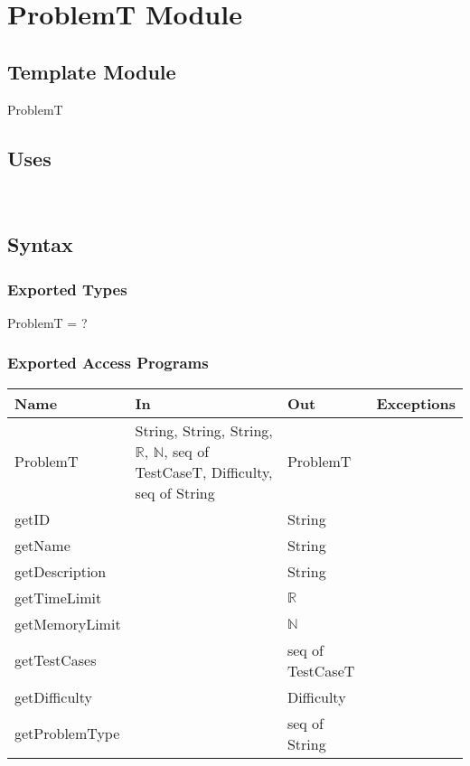 \documentclass[12pt, titlepage]{article}
\begin{document}
\newpage

\section{ProblemT Module} \label{ProblemT} 

\subsection{Template Module}

ProblemT

\subsection{Uses}
\\

\subsection{Syntax}


\subsubsection{Exported Types}

ProblemT = ?

\subsubsection{Exported Access Programs}

\begin{center}
\begin{tabular}{ |  p{4cm} | p{3cm} |  p{3cm} | p{5cm} | }
\hline
\textbf{Name} & \textbf{In} & \textbf{Out} & \textbf{Exceptions} \\
\hline
ProblemT & String, String, String, $\mathbb{R}$, $\mathbb{N}$, seq of TestCaseT, Difficulty, seq of String  & ProblemT  & \\
getID & & String & \\
getName & & String & \\
getDescription & & String & \\
getTimeLimit & & $\mathbb{R}$  & \\
getMemoryLimit & & $\mathbb{N}$ & \\
getTestCases & & seq of TestCaseT & \\
getDifficulty & & Difficulty & \\
getProblemType & & seq of String & \\

\hline
\end{tabular}
\end{center}
\end{document}

